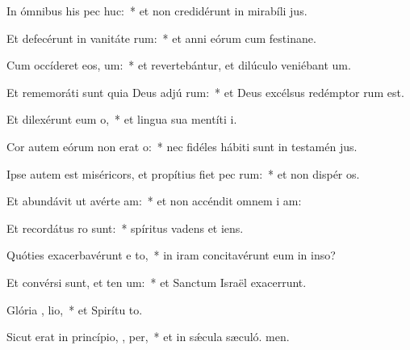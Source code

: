 \item In ómnibus his pec huc:~* et non credidérunt in mirabíli jus.
\item Et defecérunt in vanitáte  rum:~* et anni eórum cum festinane.
\item Cum occíderet eos,  um:~* et revertebántur, et dilúculo veniébant  um.
\item Et rememoráti sunt quia Deus adjú  rum:~* et Deus excélsus redémptor rum est.
\item Et dilexérunt eum   o,~* et lingua sua mentíti  i.
\item Cor autem eórum non erat   o:~* nec fidéles hábiti sunt in testamén jus.
\item Ipse autem est miséricors, et propítius fiet pec rum:~* et non dispér os.
\item Et abundávit ut avérte  am:~* et non accéndit omnem i am:
\item Et recordátus   ro sunt:~* spíritus vadens et  iens.
\item Quóties exacerbavérunt e  to,~* in iram concitavérunt eum in inso?
\item Et convérsi sunt, et ten um:~* et Sanctum Israël exacerrunt.
\item Glória ,  lio,~* et Spirítu to.
\item Sicut erat in princípio,  ,  per,~* et in sǽcula sæculó. men.
